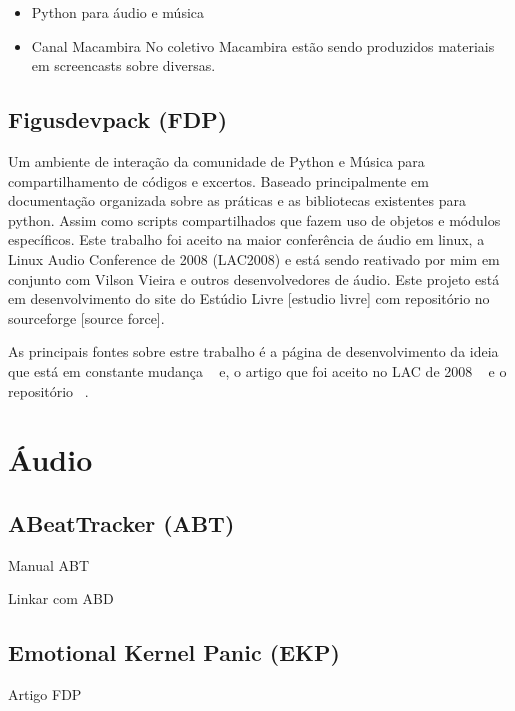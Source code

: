 \begin{itemize}
    \item Python para áudio e música


    \item Canal Macambira
No coletivo Macambira estão sendo produzidos materiais em screencasts sobre
diversas.
\end{itemize}



\subsection{Figusdevpack (FDP)}

Um ambiente de interação da comunidade de Python e Música 
para compartilhamento de códigos e excertos. Baseado principalmente
em documentação organizada sobre as práticas e as bibliotecas
existentes para python. Assim como scripts compartilhados que
fazem uso de objetos e módulos específicos. Este trabalho foi aceito na
maior conferência de áudio em linux, a Linux Audio Conference de 2008
(LAC2008) e está sendo reativado por mim em conjunto com Vilson Vieira
e outros desenvolvedores de áudio. Este projeto está em desenvolvimento
do site do Estúdio Livre [estudio livre] com repositório no sourceforge [source force].

As principais fontes sobre estre trabalho é a página de desenvolvimento da ideia
que está em constante mudança ~\cite{http://estudiolivre.org/tiki-index.php?page=fdp&highlight=fdp fdpel}
e, o artigo que foi aceito no LAC de 2008 ~\cite{http://www.estudiolivre.org/el-gallery_view.php?arquivoId=8221 fdplac2008}
e o repositório ~\cite{http://sourceforge.net/projects/fdpack/develop fdpsf}.

\section{Áudio}

\subsection{ABeatTracker (ABT)}

Manual ABT

Linkar com ABD

\subsection{Emotional Kernel Panic (EKP)}

Artigo FDP

